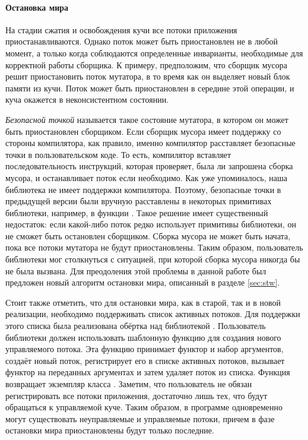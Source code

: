 \paragraph{Остановка мира}
На стадии сжатия и освобождения кучи все потоки приложения приостанавливаются. 
Однако поток может быть приостановлен не в любой момент, а только когда соблюдаются 
определенные инварианты, необходимые для корректной работы сборщика. 
К примеру, предположим, что сборщик мусора решит приостановить поток мутатора, в то время 
как он выделяет новый блок памяти из кучи. 
Поток может быть приостановлен в середине этой операции, и куча окажется в неконсистентном 
состоянии.
    
\emph{Безопасной точкой} называется такое состояние мутатора, в котором он может быть 
приостановлен сборщиком. 
Если сборщик мусора имеет поддержку со стороны компилятора, как правило, именно компилятор 
расставляет безопасные точки в пользовательском коде. 
То есть, компилятор вставляет последовательность инструкций, которая проверяет, была ли 
запрошена сборка мусора, и останавливает поток если необходимо. 
Как уже упоминалось, наша библиотека не имеет поддержки компилятора. 
Поэтому, безопасные точки в предыдущей версии были вручную расставлены в некоторых 
примитивах библиотеки, например, в функции . 
Такое решение имеет существенный недостаток: если какой-либо поток редко использует 
примитивы библиотеки, он не сможет быть остановлен сборщиком. 
Сборка мусора не может быть начата, пока все потоки мутатора не будут приостановлены. 
Таким образом, пользователь библиотеки мог столкнуться с ситуацией, при которой сборка 
мусора никогда бы не была вызвана. 
Для преодоления этой проблемы в данной работе был предложен новый алгоритм остановки мира, 
описанный в разделе \ref{sec:stw}.

Стоит также отметить, что для остановки мира, как в старой, так и в новой реализации, 
необходимо поддерживать список активных потоков. 
Для поддержки этого списка была реализована обёртка над библиотекой . 
Пользователь библиотеки должен использовать шаблонную функцию  
для создания нового управляемого потока. 
Эта функцию принимает функтор и набор аргументов, создаёт новый поток, регистрирует его в 
списке активных потоков, вызывает функтор на переданных аргументах и затем удаляет поток из 
списка. 
Функция  возвращает экземпляр класса . 
Заметим, что пользователь не обязан регистрировать все потоки приложения, достаточно лишь тех, 
что будут обращаться к управляемой куче. 
Таким образом, в программе одновременно могут существовать неуправляемые и управляемые потоки, 
причем в фазе остановки мира приостановлены будут только последние. 

